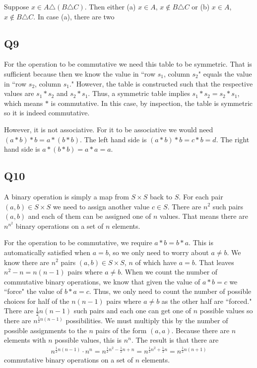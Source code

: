 \documentclass[12pt]{article}
\numberwithin{theorem}{section}
\numberwithin{equation}{section}
\numberwithin{remark}{section}
\numberwithin{definition}{section}
\numberwithin{theorem}{section}
\numberwithin{lemma}{section}
\numberwithin{example}{section}
\begin{document}
Suppose $x \in A \triangle (B \triangle C)$. Then either (a) $x\in A$, $x \notin B \triangle C$ or (b) $x\in A$, $x \notin B \triangle C$. In case (a), there are two 



\subsection{Q9}

For the operation to be commutative we need this table to be symmetric. That is sufficient because then we know the value in ``row $s_1$, column $s_2$" equals the value in ``row $s_2$, column $s_1$." However, the table is constructed such that the respective values are $s_1 * s_2$ and $s_2 * s_1$. Thus, a symmetric table implies $s_1*s_2=s_2*s_1$, which means $*$ is commutative. In this case, by inspection, the table is symmetric so it is indeed commutative. 

However, it is not associative. For it to be associative we would need $(a*b)*b=a*(b*b)$. The left hand side is $(a*b)*b=c*b=d$. The right hand side is $a*(b*b)=a*a=a$. 



\subsection{Q10}

A binary operation is simply a map from $S \times S$ back to $S$. For each pair $(a,b)\in S\times S$ we need to assign another value $c\in S$. There are $n^2$ such pairs $(a,b)$ and each of them can be assigned one of $n$ values. That means there are $n^{n^2}$ binary operations on a set of $n$ elements. 

For the operation to be commutative, we require $a * b = b * a$. This is automatically satisfied when $a=b$, so we only need to worry about $a\neq b$. We know there are $n^2$ pairs $(a,b)\in S \times S$, $n$ of which have $a=b$. That leaves $n^2-n=n(n-1)$ pairs where $a\neq b$. When we count the number of commutative binary operations, we know that given the value of $a * b = c$ we ``force" the value of $b * a = c$. Thus, we only need to count the number of possible choices for half of the $n(n-1)$ pairs where $a\neq b$ as the other half are ``forced." There are $\frac{1}{2}n(n-1)$ such pairs and each one can get one of $n$ possible values so there are $n^{\frac{1}{2}n(n-1)}$ possibilities. We must multiply this by the number of possible assignments to the $n$ pairs of the form $(a,a)$. Because there are $n$ elements with $n$ possible values, this is $n^n$. The result is that there are
\begin{align*}
	n^{\frac{1}{2}n(n-1)}\cdot n^n = n^{\frac{1}{2}n^2 - \frac{1}{2}n + n} = n^{\frac{1}{2}n^2 + \frac{1}{2}n} = n^{\frac{1}{2}n(n+1)}
\end{align*}
commutative binary operations on a set of $n$ elements. 
\end{document}
